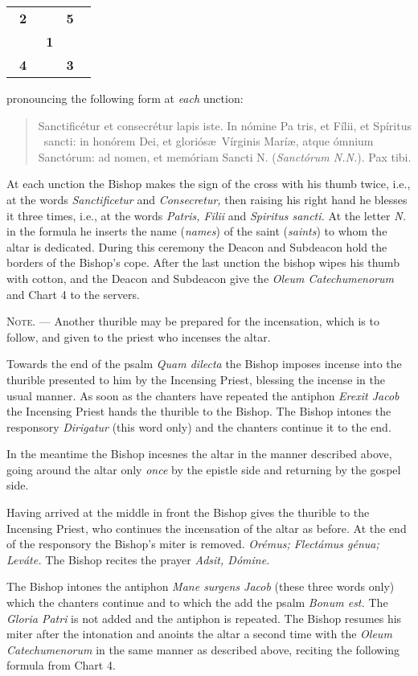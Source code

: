 \documentclass[letterpaper]{report}
\newcommand\crossplan{
\begin{center}
    \begin{tabular}{ | l c r | }
       \hline
       \cross\ \textbf{2} &                    & \textbf{5} \cross\ \\
                          & \cross\ \textbf{1} &                    \\
       \cross\ \textbf{4} &                    & \textbf{3} \cross\ \\
       \hline
   \end{tabular} 
\end{center}
}
\begin{document}
{\crossplan

pronouncing the following form at \textit{each} unction:

\begin{quote}
    Sancti\cross ficétur et conse\cross crétur lapis iste. In nómine Pa\cross
    tris, et Fí\cross lii, et Spíritus \cross\ sancti: in honórem Dei, et
    gloriós\ae\ Vírginis Marí\ae, atque ómnium Sanctórum: ad nomen, et memóriam
    Sancti N. (\textit{Sanctórum N.N.}). Pax tibi.
\end{quote}

At each unction the Bishop makes the sign of the cross with his thumb twice,
i.e., at the words \textit{Sanctificetur} and \textit{Consecretur,} then
raising his right hand he blesses it three times, i.e., at the words
\textit{Patris, Filii} and \textit{Spiritus sancti.} At the letter \textit{N.}
in the formula he inserts the name (\textit{names}) of the saint
(\textit{saints}) to whom the altar is dedicated. During this ceremony the
Deacon and Subdeacon hold the borders of the Bishop's cope. After the last
unction the bishop wipes his thumb with cotton, and the Deacon and Subdeacon
give the \textit{Oleum Catechumenorum} and Chart 4 to the servers.

\textsc{Note. ---} Another thurible may be prepared for the incensation, which
is to follow, and given to the priest who incenses the altar.

\rubric Towards the end of the psalm \textit{Quam dilecta} the Bishop imposes
incense into the thurible presented to him by the Incensing Priest, blessing
the incense in the usual manner. As soon as the chanters have repeated the
antiphon \textit{Erexit Jacob} the Incensing Priest hands the thurible to the
Bishop. The Bishop intones the responsory \textit{Dirigatur} (this word only)
and the chanters continue it to the end.

In the meantime the Bishop incesnes the altar in the manner described above,
going around the altar only \textit{once} by the epistle side and returning by
the gospel side.

\rubric Having arrived at the middle in front the Bishop gives the thurible to
the Incensing Priest, who continues the incensation of the altar as before. At
the end of the responsory the Bishop's miter is removed. \textit{Orémus;
Flectámus génua; Leváte.} The Bishop recites the prayer \textit{Adsit, Dómine.}

\rubric The Bishop intones the antiphon \textit{Mane surgens Jacob} (these
three words only) which the chanters continue and to which the add the psalm
\textit{Bonum est.} The \textit{Gloria Patri} is not added and the antiphon is
repeated. The Bishop resumes his miter after the intonation and anoints the
altar a second time with the \textit{Oleum Catechumenorum} in the same manner
as described above, reciting the following formula from Chart 4.

}
\end{document}

